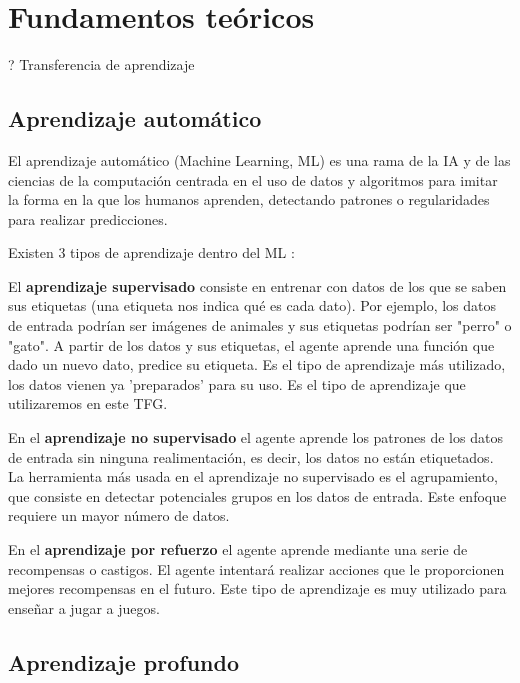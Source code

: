 \chapter{Fundamentos teóricos}
\thispagestyle{empty}

? Transferencia de aprendizaje

\section{Aprendizaje automático}
El aprendizaje automático (Machine Learning, ML) \cite{16,17} es una rama de la IA y de las ciencias de la computación centrada en el uso de datos y algoritmos para imitar la forma en la que los humanos aprenden, detectando patrones o regularidades para realizar predicciones.

Existen 3 tipos de aprendizaje dentro del ML \cite{18,19}:

El \textbf{aprendizaje supervisado} consiste en entrenar con datos de los que se saben sus etiquetas (una etiqueta nos indica qué es cada dato). Por ejemplo, los datos de entrada podrían ser imágenes de animales y sus etiquetas podrían ser "perro" o "gato". A partir de los datos y sus etiquetas, el agente aprende una función que dado un nuevo dato, predice su etiqueta. Es el tipo de aprendizaje más utilizado, los datos vienen ya 'preparados' para su uso. Es el tipo de aprendizaje que utilizaremos en este TFG.

En el \textbf{aprendizaje no supervisado} el agente aprende los patrones de los datos de entrada sin ninguna realimentación, es decir, los datos no están etiquetados. La herramienta más usada en el aprendizaje no supervisado es el agrupamiento, que consiste en detectar potenciales grupos en los datos de entrada. Este enfoque requiere un mayor número de datos.

En el \textbf{aprendizaje por refuerzo} el agente aprende mediante una serie de recompensas o castigos. El agente intentará realizar acciones que le proporcionen mejores recompensas en el futuro. Este tipo de aprendizaje es muy utilizado para enseñar a jugar a juegos.

\section{Aprendizaje profundo}

